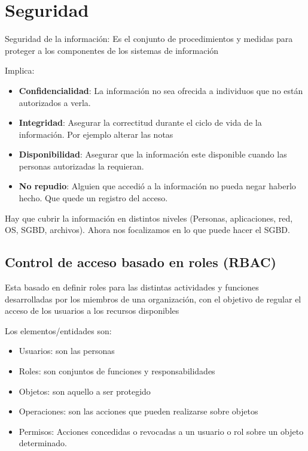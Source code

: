 \section{Seguridad}

Seguridad de la información: Es el conjunto de procedimientos y medidas para proteger a los componentes de los sistemas de información

\medskip
Implica:

\begin{itemize}
\item \textbf{Confidencialidad}: La información no sea ofrecida a individuos que no están autorizados a verla.
\item \textbf{Integridad}: Asegurar la correctitud durante el ciclo de vida de la información. Por ejemplo alterar las notas
\item \textbf{Disponibilidad}: Asegurar que la información este disponible cuando las personas autorizadas la requieran.
\item \textbf{No repudio}: Alguien que accedió a la información no pueda negar haberlo hecho. Que quede un registro del acceso.
\end{itemize}

\medskip
Hay que cubrir la información en distintos niveles (Personas, aplicaciones, red, OS, SGBD, archivos). Ahora nos focalizamos en lo que puede hacer el SGBD.

\subsection*{Control de acceso basado en roles (RBAC)}
Esta basado en definir roles para las distintas actividades y funciones desarrolladas por los miembros de una organización, con el objetivo de regular el acceso de los usuarios a los recursos disponibles

\medskip
Los elementos/entidades son:
\begin{itemize}
\item Usuarios: son las personas
\item Roles:  son conjuntos de funciones y responsabilidades
\item Objetos: son aquello a ser protegido
\item Operaciones: son las acciones que pueden realizarse sobre objetos
\item Permisos: Acciones concedidas o revocadas a un usuario o rol sobre un objeto determinado.
\end{itemize}


